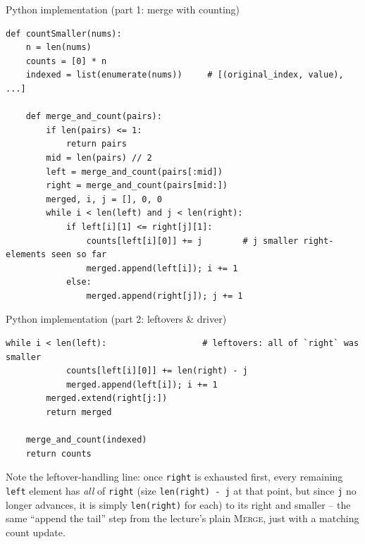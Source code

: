 \documentclass[11pt,aspectratio=169]{beamer}
\begin{document}
\begin{frame}[fragile]{Python implementation (part 1: merge with counting)}
  \begin{lstlisting}[style=py,aboveskip=0pt,belowskip=0pt]
def countSmaller(nums):
    n = len(nums)
    counts = [0] * n
    indexed = list(enumerate(nums))     # [(original_index, value), ...]

    def merge_and_count(pairs):
        if len(pairs) <= 1:
            return pairs
        mid = len(pairs) // 2
        left = merge_and_count(pairs[:mid])
        right = merge_and_count(pairs[mid:])
        merged, i, j = [], 0, 0
        while i < len(left) and j < len(right):
            if left[i][1] <= right[j][1]:
                counts[left[i][0]] += j        # j smaller right-elements seen so far
                merged.append(left[i]); i += 1
            else:
                merged.append(right[j]); j += 1
  \end{lstlisting}
\end{frame}

\begin{frame}[fragile]{Python implementation (part 2: leftovers \& driver)}
  \begin{lstlisting}[style=py,aboveskip=0pt,belowskip=0pt]
        while i < len(left):                   # leftovers: all of `right` was smaller
            counts[left[i][0]] += len(right) - j
            merged.append(left[i]); i += 1
        merged.extend(right[j:])
        return merged

    merge_and_count(indexed)
    return counts
  \end{lstlisting}
  \vspace{0.5em}
  Note the leftover-handling line: once \texttt{right} is exhausted first, every remaining
  \texttt{left} element has \emph{all} of \texttt{right} (size \texttt{len(right) - j} at
  that point, but since \texttt{j} no longer advances, it is simply \texttt{len(right)} for
  each) to its right and smaller -- the same ``append the tail'' step from the lecture's
  plain \textsc{Merge}, just with a matching count update.
\end{frame}
\end{document}
